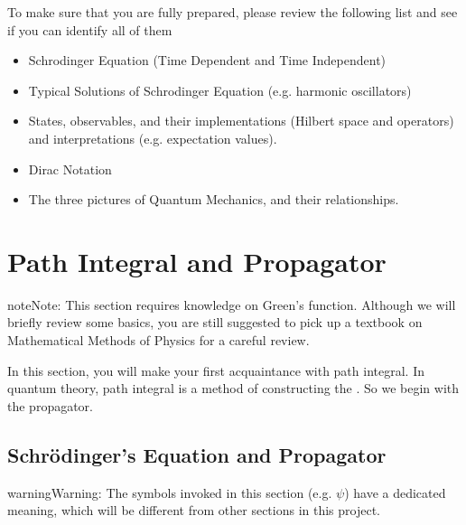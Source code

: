 \documentclass[letterpaper,10pt,english]{sphinxmanual}
\begin{document}
To make sure that you are fully prepared, please review the following list and see if you can identify all of them
\begin{itemize}
\item {} 
Schrodinger Equation (Time Dependent and Time Independent)

\item {} 
Typical Solutions of Schrodinger Equation (e.g. harmonic oscillators)

\item {} 
States, observables, and their implementations (Hilbert space and operators) and interpretations (e.g. expectation values).

\item {} 
Dirac Notation

\item {} 
The three pictures of Quantum Mechanics, and their relationships.

\end{itemize}


\section{Path Integral and Propagator}
\label{\detokenize{pi_ppgt:path-integral-and-propagator}}\label{\detokenize{pi_ppgt::doc}}
\begin{sphinxadmonition}{note}{Note:}
This section requires knowledge on Green's function. Although we will briefly review some basics, you are still suggested to pick up a textbook on Mathematical Methods of Physics for a careful review.
\end{sphinxadmonition}

In this section, you will make your first acquaintance with path integral. In quantum theory, path integral is a method of constructing the . So we begin with the propagator.


\subsection{Schrödinger’s Equation and Propagator}
\label{\detokenize{pi_ppgt:schrodingers-equation-and-propagator}}
\begin{sphinxadmonition}{warning}{Warning:}
The symbols invoked in this section (e.g. \(\psi\)) have a dedicated meaning, which will be different from other sections in this project.
\end{sphinxadmonition}
\end{document}
